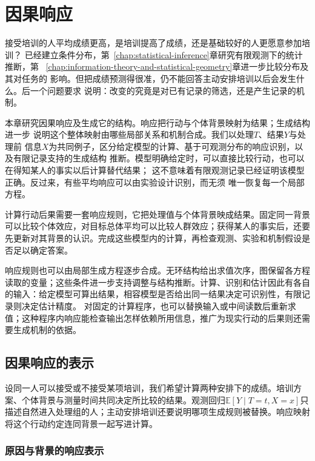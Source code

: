 \chapter{因果响应}
\label{chap:causal-inference}

接受培训的人平均成绩更高，是培训提高了成绩，还是基础较好的人更愿意参加培训？
已经建立条件分布，第~\ref{chap:statistical-inference}章研究有限观测下的统计推断，第
~\ref{chap:information-theory-and-statistical-geometry}章进一步比较分布及其对任务的
影响。但把成绩预测得很准，仍不能回答主动安排培训以后会发生什么。后一个问题要求
说明：改变的究竟是对已有记录的筛选，还是产生记录的机制。

本章研究因果响应及生成它的结构。响应把行动与个体背景映射为结果；生成结构进一步
说明这个整体映射由哪些局部关系和机制合成。我们以处理\(T\)、结果\(Y\)与处理前
信息\(X\)为共同例子，区分给定模型的计算、基于可观测分布的响应识别，以及有限记录支持的生成结构
推断。模型明确给定时，可以直接比较行动，也可以在得知某人的事实以后计算替代结果；
这不意味着有限观测记录已经证明该模型正确。反过来，有些平均响应可以由实验设计识别，而无须
唯一恢复每一个局部方程。

计算行动后果需要一套响应规则，它把处理值与个体背景映成结果。固定同一背景可以比较个体效应，对目标总体平均可以比较人群效应；获得某人的事实后，还要先更新对其背景的认识。完成这些模型内的计算，再检查观测、实验和机制假设是否足以确定答案。

响应规则也可以由局部生成方程逐步合成。无环结构给出求值次序，图保留各方程读取的变量；这些条件进一步支持调整与结构推断。计算、识别和估计因此有各自的输入：给定模型可算出结果，相容模型是否给出同一结果决定可识别性，有限记录则决定估计精度。
对固定的计算程序，也可以替换输入或中间读数后重新求值；这种程序内响应能检查输出怎样依赖所用信息，推广为现实行动的后果则还需要生成机制的依据。

\section{因果响应的表示}
\label{sec:causal-response-representation}

设同一人可以接受或不接受某项培训，我们希望计算两种安排下的成绩。培训方案、个体背景与测量时间共同决定所比较的结果。观测回归\(\mathbb E[Y\mid T=t,X=x]\)只描述自然进入处理组的人；主动安排培训还要说明哪项生成规则被替换。响应映射将这个行动约定连同背景一起写进计算。

\subsection{原因与背景的响应表示}
\label{sec:causal-observation-generation}


